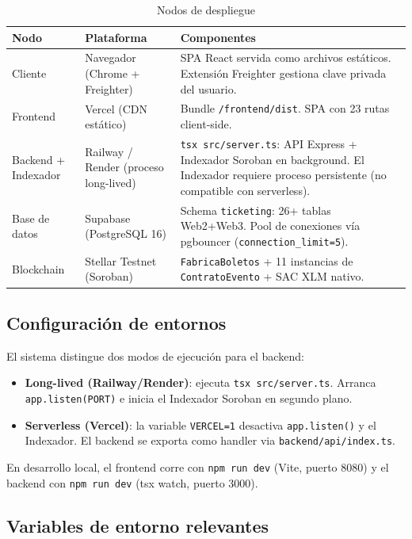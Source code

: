 \documentclass[12pt,oneside]{article}
\begin{document}
\begin{table}[htbp]
\centering
\caption{Nodos de despliegue}
\begin{tabularx}{\textwidth}{l l X}
\toprule
\textbf{Nodo} & \textbf{Plataforma} & \textbf{Componentes} \\
\midrule
Cliente & Navegador (Chrome + Freighter) & SPA React servida como archivos estáticos. Extensión Freighter gestiona clave privada del usuario. \\
Frontend & Vercel (CDN estático) & Bundle \texttt{/frontend/dist}. SPA con 23 rutas client-side. \\
Backend + Indexador & Railway / Render (proceso long-lived) & \texttt{tsx src/server.ts}: API Express + Indexador Soroban en background. El Indexador requiere proceso persistente (no compatible con serverless). \\
Base de datos & Supabase (PostgreSQL 16) & Schema \texttt{ticketing}: 26+ tablas Web2+Web3. Pool de conexiones vía pgbouncer (\texttt{connection\_limit=5}). \\
Blockchain & Stellar Testnet (Soroban) & \texttt{FabricaBoletos} + 11 instancias de \texttt{ContratoEvento} + SAC XLM nativo. \\
\bottomrule
\end{tabularx}
\end{table}

\subsection{Configuración de entornos}

El sistema distingue dos modos de ejecución para el backend:

\begin{itemize}
  \item \textbf{Long-lived (Railway/Render)}: ejecuta \texttt{tsx src/server.ts}. Arranca \texttt{app.listen(PORT)} e inicia el Indexador Soroban en segundo plano.
  \item \textbf{Serverless (Vercel)}: la variable \texttt{VERCEL=1} desactiva \texttt{app.listen()} y el Indexador. El backend se exporta como handler via \texttt{backend/api/index.ts}.
\end{itemize}

En desarrollo local, el frontend corre con \texttt{npm run dev} (Vite, puerto 8080) y el backend con \texttt{npm run dev} (tsx watch, puerto 3000).

\subsection{Variables de entorno relevantes}
\end{document}
